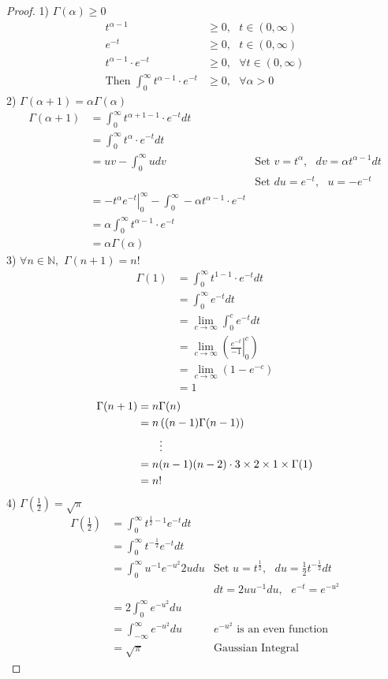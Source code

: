 \documentclass[11pt,oneside]{book}
\theoremstyle{break}
\theoremstyle{break}
\newcommand{\N}{\mathbb{N}}
\begin{document}
\begin{proof}
1) $\Gamma (\alpha)\geq 0$ \begin{align*}
t^{\alpha -1}&\geq 0,\text{ } t\in(0,\infty)\\
e^{-t}&\geq 0,\text{ } t\in(0,\infty)\\
t^{\alpha -1}\cdot e^{-t}&\geq 0,\text{ } \forall t\in (0,\infty)\\
\text{Then }\int_{0}^{\infty} t^{\alpha -1}\cdot e^{-t}&\geq 0,\text{ }\forall \alpha>0
\end{align*}
2) $\Gamma (\alpha +1)=\alpha \Gamma(\alpha)$\begin{align*}
\Gamma (\alpha +1)&=\int_{0}^{\infty}t^{\alpha+1 -1}\cdot e^{-t}dt\\
&=\int_{0}^{\infty}t^{\alpha}\cdot e^{-t}dt\\
&=uv - \int_{0}^{\infty} udv &\text{Set } v=t^{\alpha}, \text{ }dv=\alpha t^{\alpha -1}dt\\
&&\text{Set } du=e^{-t}, \text{ }u=-e^{-t}\\
&=\left. -t^{\alpha} e^{-t}\right|_{0}^{\infty}-\int_{0}^{\infty}-\alpha t^{\alpha -1}\cdot e^{-t}\\
&=\alpha \int_{0}^{\infty} t^{\alpha -1}\cdot e^{-t}\\
&=\alpha \Gamma(\alpha)
\end{align*}
3) $\forall n \in \N,$ $\Gamma(n+1)=n!$ 
\begin{align*}
\Gamma(1)&=\int_{0}^{\infty}t^{1-1}\cdot e^{-t}dt\\
&=\int_{0}^{\infty}e^{-t}dt\\
&=\lim_{c\rightarrow \infty}\int_{0}^{c}e^{-t}dt\\
&=\lim_{c\rightarrow \infty}\left( \left. \frac{e^{-t}}{-1}\right|_{0}^{c} \right)\\
&=\lim_{c\rightarrow \infty}\left( 1-e^{-c} \right)\\
&=1
\end{align*}
\begin{align*}
\Gamma(n+1)&=n\Gamma(n)\\
&=n\left((n-1)\Gamma(n-1)\right)\\
&\text{\qquad} \vdots\\
&=n(n-1)(n-2)\cdot 3\times 2 \times 1 \times \Gamma(1)\\
&=n!
\end{align*}
4)  $\Gamma\left(\frac{1}{2} \right)=\sqrt{\pi}$\begin{align*}
\Gamma(\frac{1}{2})&=\int_{0}^{\infty}t^{\frac{1}{2}-1}e^{-t}dt\\
&=\int_{0}^{\infty}t^{-\frac{1}{2}}e^{-t}dt\\
&=\int_{0}^{\infty}u^{-1}e^{-u^2}2udu&\text{Set }u=t^{\frac{1}{2}},\text{ }du=\frac{1}{2}t^{-\frac{1}{2}}dt\\
&&dt=2uu^{-1}du,\text{ }e^{-t}=e^{-u^2}\\
&=2\int_{0}^{\infty}e^{-u^2}du\\
&=\int_{-\infty}^{\infty}e^{-u^2}du&e^{-u^2}\text{ is an even function}\\
&=\sqrt{\pi} &\text{Gaussian Integral}
\end{align*}
\end{proof}
\end{document}
